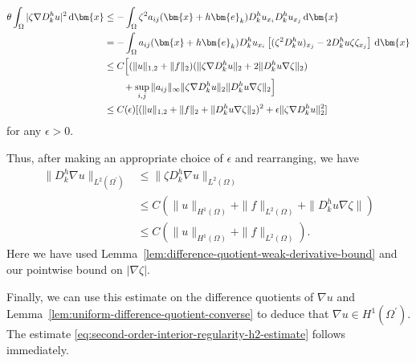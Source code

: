 \begin{Proof}
\[\begin{aligned}
\theta\int_\Omega|\zeta\nabla D_k^hu|^2\,\mathrm{d}\bm{x}
&\leq-\int_\Omega\zeta^2a_{ij}(\bm{x}+h\bm{e}_k)D_k^hu_{x_i}D_k^hu_{x_j}\,\mathrm{d}\bm{x}\\
&=-\int_\Omega a_{ij}(\bm{x}+h\bm{e}_k)D_k^hu_{x_i}\left[(\zeta^2D_k^hu)_{x_j}-2D_k^hu\zeta\zeta_{x_j}\right]\,\mathrm{d}\bm{x}\\
&\leq C\Bigl[(\|u\|_{1,2}+\|f\|_2)(\|\zeta\nabla D_k^hu\|_2+2\|D_k^hu\nabla\zeta\|_2)\\
&\qquad+\sup_{i,j}\|a_{ij}\|_\infty\|\zeta\nabla D_k^hu\|_2\|D_k^hu\nabla\zeta\|_2\Bigr]\\
&\leq C(\epsilon)[(\|u\|_{1,2}+\|f\|_2+\|D_k^hu\nabla\zeta\|_2)^2+\epsilon\|\zeta\nabla D_k^hu\|_2^2]
\end{aligned}\]for any $\epsilon>0$.

Thus, after making an appropriate choice of $\epsilon$ and rearranging, we have\[\begin{aligned}
\|D_k^h\nabla u\|_{L^2(\Omega^{\prime})}&\leq\|\zeta D_k^h\nabla u\|_{L^2(\Omega)}\\
&\leq C(\|u\|_{H^1(\Omega)}+\|f\|_{L^2(\Omega)}+\|D_k^hu\nabla\zeta\|)\\
&\leq C(\|u\|_{H^1(\Omega)}+\|f\|_{L^2(\Omega)}).
\end{aligned}\]Here we have used Lemma~\ref{lem:difference-quotient-weak-derivative-bound} and our pointwise bound on $|\nabla\zeta|$.

Finally, we can use this estimate on the difference quotients of $\nabla u$ and Lemma~\ref{lem:uniform-difference-quotient-converse} to deduce that $\nabla u\in H^1(\Omega^{\prime})$. The estimate \eqref{eq:second-order-interior-regularity-h2-estimate} follows immediately.
\end{Proof}
\endgroup
